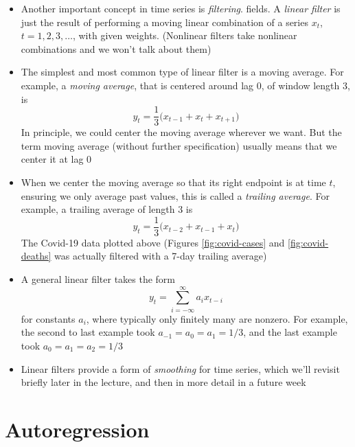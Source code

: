 \documentclass{article}
\begin{document}
\begin{itemize}
\item Another important concept in time series is \emph{filtering}. 
  fields. A \emph{linear filter} is just the result of performing a moving 
  linear combination of a series $x_t$, $t = 1,2,3,\dots$, with given
  weights. (Nonlinear filters take nonlinear combinations and we won't talk
  about them)

\item The simplest and most common type of linear filter is a moving
  average. For example, a \emph{moving average}, that is centered around lag 0,
  of window length 3, is 
  \[
  y_t = \frac{1}{3} \Big( x_{t-1} + x_t + x_{t+1} \Big)
  \]
  In principle, we could center the moving average wherever we want. But the
  term moving average (without further specification) usually means that we
  center it at lag 0

\item When we center the moving average so that its right endpoint is at time
  $t$, ensuring we only average past values, this is called a \emph{trailing
    average}. For example, a trailing average of length 3 is    
  \[
  y_t = \frac{1}{3} \Big( x_{t-2} + x_{t-1} + x_t \Big) 
  \]
  The Covid-19 data plotted above (Figures \ref{fig:covid-cases} and
  \ref{fig:covid-deaths} was actually filtered with a 7-day trailing average)

\item A general linear filter takes the form
  \[
  y_t = \sum_{i=-\infty}^\infty a_i x_{t-i}
  \]
  for constants $a_i$, where typically only finitely many are nonzero. For
  example, the second to last example took $a_{-1} = a_0 = a_1 = 1/3$, and the
  last example took $a_0 = a_1 = a_2 = 1/3$

\item Linear filters provide a form of \emph{smoothing} for time series, which
  we'll revisit briefly later in the lecture, and then in more detail in a
  future week  
\end{itemize}

\section{Autoregression}
\end{document}
